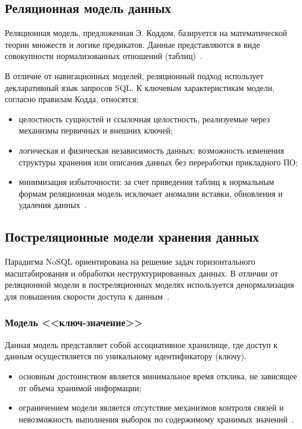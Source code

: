 \subsection{Реляционная модель данных}

Реляционная модель, предложенная Э. Коддом, базируется на математической теории множеств и логике предикатов. Данные представляются в виде совокупности нормализованных отношений (таблиц)~\cite{avrunev}.

В отличие от навигационных моделей, реляционный подход использует декларативный язык запросов SQL. К ключевым характеристикам модели, согласно правилам Кодда, относятся:
\begin{itemize}
	\item целостность сущностей и ссылочная целостность, реализуемые через механизмы первичных и внешних ключей;
	\item логическая и физическая независимость данных: возможность изменения структуры хранения или описания данных без переработки прикладного ПО;
	\item минимизация избыточности: за счет приведения таблиц к нормальным формам реляционная модель исключает аномалии вставки, обновления и удаления данных~\cite{codd, avrunev, kuznetsov}. 
\end{itemize}

\subsection{Постреляционные модели хранения данных}

Парадигма NoSQL ориентирована на решение задач горизонтального масштабирования и обработки неструктурированных данных. В отличии от реляционной модели в постреляционных моделях используется денормализация для повышения скорости доступа к данным~\cite{avrunev}.

\subsubsection{Модель <<ключ-значение>>}
Данная модель представляет собой ассоциативное хранилище, где доступ к данным осуществляется по уникальному идентификатору (ключу).
\begin{itemize}
	\item основным достоинством является минимальное время отклика, не зависящее от объема хранимой информации;
	\item ограничением модели является отсутствие механизмов контроля связей и невозможность выполнения выборок по содержимому хранимых значений~\cite{avrunev, komarov}.
\end{itemize}


